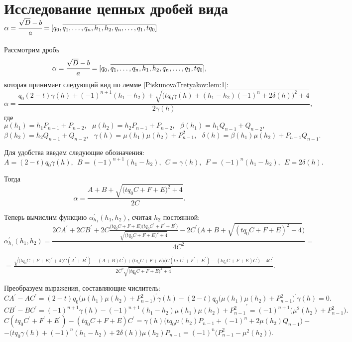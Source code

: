 \section{Исследование цепных дробей вида
\newline$\alpha=\cfrac {\sqrt{D}-b}a=[{q_0},\overline{{q_1},\dots,{q_n},{h_1},{h_2},{q_n},\dots,{q_1},t{q_0}}]$}

Рассмотрим дробь
$$\alpha=\cfrac {\sqrt {D}-b}a=[{q_0},\overline{{q_1},\dots,{q_n},{h_1},{h_2},{q_n},\dots,{q_1},t{q_0}}],$$
\noindent
которая принимает следующий вид по лемме \ref{PiskunovaTretyakov:lem:1}:
\begin{equation}
\alpha=\frac {{q_0}(2-t)\gamma (h)+(-1)^{n+1}({h_1}-{h_2})+\sqrt{\bigl(t{q_0}\gamma (h)+({h_1}-{h_2})(-1)^{n}+2\delta (h)\bigr)^2+4}}{2\gamma (h)},
\end{equation}
где
\[\mu(h_1)={h_1}{P_{n-1}}+{P_{n-2}}, \ \ \ \mu(h_2)={h_2}{P_{n-1}}+{P_{n-2}}, \ \ \ \beta(h_1)={h_1}{Q_{n-1}}+{Q_{n-2}},\]
\[\beta(h_2)={h_2}{Q_{n-1}}+{Q_{n-2}}, \ \ \ \gamma(h)=\mu(h_1)\mu(h_2)+{P^{2}_{n-1}}, \ \ \ \delta(h)=\beta(h_1)\mu(h_2)+{P_{n-1}}{Q_{n-1}}.\]

Для удобства введем следующие обозначения:
\[A=(2-t){q_0}\gamma(h), \ \ B=(-1)^{n+1}({h_1}-{h_2}), \ \ C=\gamma(h), \ \ F=(-1)^{n}({h_1}-{h_2}), \ \ E=2\delta(h).\]

Тогда
\[\alpha=\frac {A+B+\sqrt{\bigl(t{q_0}C+F+E\bigr)^2+4}}{2C}.\]

Теперь вычислим функцию ${\alpha}^\prime_{h_1}({h_1},{h_2})$, считая $h_2$ постоянной:
\small \[\alpha^\prime_{h_1}({h_1},{h_2})=
\frac{2CA^\prime+2CB^\prime+2C\frac {\bigl(t{q_0}C+F+E\bigr)\bigl(t{q_0}C^\prime+F^\prime+E^\prime\bigr)}{\sqrt{\bigl(t{q_0}C+F+E\bigr)^{2}+4}}-
2C^\prime{\bigl(A+B+\sqrt{(t{q_0}C+F+E)^{2}+4}\bigr)}}{4C^2}=\]
\normalsize
\begin{center}
$=\frac {\sqrt{\bigl(t{q_0}C+F+E\bigr)^{2}+4}\bigl(C(A^\prime+B^\prime)-(A+B)C^\prime\bigr)+
\bigl(t{q_0}C+F+E\bigr)\bigl(C(t{q_0}C^\prime+F^\prime+E^\prime)-(t{q_0}C+F+E)C^\prime\bigr)-
4C^\prime}{2C^2{\sqrt{\bigl(t{q_0}C+F+E\bigr)^{2}+4}}}.$
\end{center}


Преобразуем выражения, составляющие числитель:
\[CA^\prime-AC^\prime=(2-t){q_0}\bigl({\mu(h_1)}{\mu(h_2)}+{P^{2}_{n-1}}\bigr)^\prime{\gamma(h)}-
(2-t){q_0}\bigl({\mu(h_1)}{\mu(h_2)}+{P^{2}_{n-1}}\bigr)^\prime{\gamma(h)}=0.\]
\[CB^\prime-BC^\prime=(-1)^{n+1}{\gamma(h)}-(-1)^{n+1}({h_1}-{h_2}){{\mu(h_1)}{\mu(h_2)}+{P^{2}_{n-1}}}^\prime=(-1)^{n+1}\bigl({\mu^{2}(h_2)}+{P^{2}_{n-1}}\bigr).\]
\[C(t{q_0}C^\prime+F^\prime+E^\prime)-(t{q_0}C+F+E)C^\prime={\gamma(h)}\bigl(t{q_0}{\mu(h_2)}{P_{n-1}}+(-1)^{n}+2{\mu(h_2)}{Q_{n-1}}\bigr)-\]
\[-\bigl(t{q_0}{\gamma(h)}+(-1)^{n}({h_1}-{h_2})+2{\delta(h)}\bigr){\mu(h_2)}{P_{n-1}}=(-1)^{n}\bigl({P^{2}_{n-1}}-{\mu^{2}(h_2)}\bigr).\]

